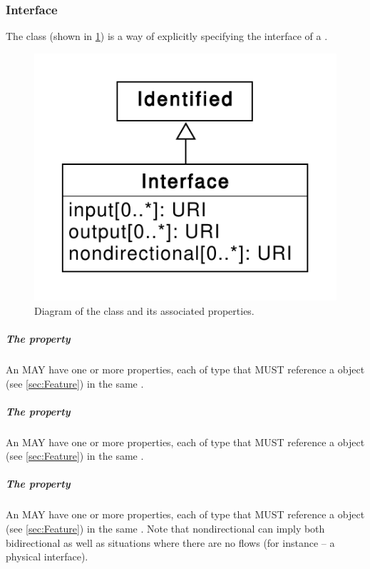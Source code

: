 
\subsubsection{Interface}
\label{sec:Interface}

The  class (shown in \ref{uml:interface}) is a way of explicitly specifying the interface of a . 

\begin{figure}[ht]
\begin{center}
\includegraphics[scale=0.6]{uml/interface}
\caption[]{Diagram of the  class and its associated properties.}
\label{uml:interface}
\end{center}
\end{figure}

\subparagraph{The  property}
\label{sec:input}

An  MAY have one or more  properties, each of type  that MUST reference a  object (see \ref{sec:Feature}) in the same .

\subparagraph{The  property}
\label{sec:output}

An  MAY have one or more  properties, each of type  that MUST reference a  object (see \ref{sec:Feature}) in the same .

\subparagraph{The  property}
\label{sec:nondirectional}

An  MAY have one or more  properties, each of type  that MUST reference a  object (see \ref{sec:Feature}) in the same . Note that nondirectional can imply both bidirectional as well as situations where there are no flows (for instance -- a physical interface).
